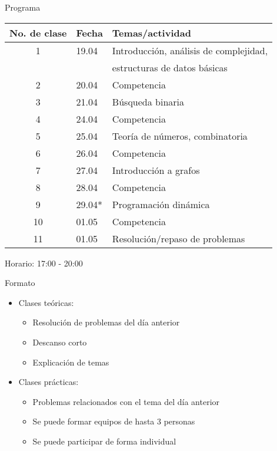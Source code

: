 \documentclass[10pt]{beamer}
\newcommand{\bi}{\begin{itemize}}
\newcommand{\ei}{\end{itemize}}
\begin{document}
\begin{frame}{Programa}
    \begin{center}
        \begin{tabular}{cl|l}

            No. de clase & Fecha & Temas/actividad \\
            \hline
            1 & 19.04 & Introducción, análisis de complejidad, \\ 
              &       & estructuras de datos básicas \\
            2 & 20.04 & Competencia \\
            3 & 21.04 & Búsqueda binaria \\
            \hline
            4 & 24.04 & Competencia \\
            5 & 25.04 & Teoría de números, combinatoria \\
            6 & 26.04 & Competencia \\
            7 & 27.04 & Introducción a grafos \\
            8 & 28.04 & Competencia \\
            9 & 29.04* & Programación dinámica \\
            \hline
            10 & 01.05 & Competencia \\
            11 & 01.05 & Resolución/repaso de problemas \\
            \hline
        \end{tabular}
    \end{center}
    Horario: 17:00 - 20:00
\end{frame}

\begin{frame}{Formato}
    \bi
        \item Clases teóricas: 
        \bi
            \item Resolución de problemas del día anterior
            \item Descanso corto
            \item Explicación de temas
        \ei
        \item Clases prácticas:
        \bi
            \item Problemas relacionados con el tema del día anterior
            \item Se puede formar equipos de hasta 3 personas
            \item Se puede participar de forma individual
        \ei
    \ei
\end{frame}
\end{document}

